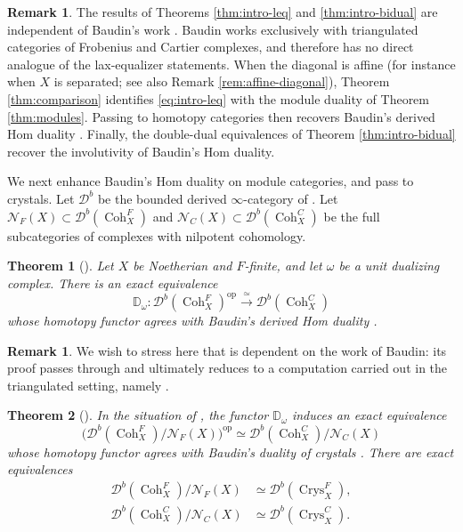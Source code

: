 \documentclass[11pt]{amsart}
\newcommand{\cN}{\mathcal{N}}
\newcommand{\op}{{\operatorname{op}}}
\newcommand{\Coh}{\operatorname{{Coh}}}
\newcommand{\Crys}{\operatorname{Crys}}
\newcommand{\Db}{\mathcal D^b}
\theoremstyle{plain}
\newtheorem{introthm}{Theorem}
\theoremstyle{definition}
\newtheorem{rmk}[rmk]{Remark}
\newtheorem{remark}[remark]{Remark}
\numberwithin{equation}{section}
\begin{document}
\begin{remark}\label{rem:intro-no-baudin}
The results of Theorems \ref{thm:intro-leq} and \ref{thm:intro-bidual} are independent of Baudin’s work \cite{Bau}. Baudin works exclusively with triangulated categories of Frobenius and Cartier complexes, and therefore has no direct analogue of the lax-equalizer statements. When the diagonal is affine (for instance when $X$ is separated; see also Remark \ref{rem:affine-diagonal}), Theorem \ref{thm:comparison} identifies \eqref{eq:intro-leq} with the module duality of Theorem \ref{thm:modules}. Passing to homotopy categories then recovers Baudin’s derived Hom duality \cite[Theorem 4.2.7]{Bau}. Finally, the double-dual equivalences of Theorem \ref{thm:intro-bidual} recover the involutivity of Baudin’s Hom duality.
\end{remark}

We next enhance Baudin's Hom duality on module categories, and pass to crystals.
Let $\Db$ be the bounded derived $\infty$-category of .
Let $\cN_F(X)\subset\Db(\Coh^F_X)$ and $\cN_C(X)\subset\Db(\Coh^C_X)$ be the full subcategories of complexes with nilpotent cohomology.

\begin{introthm}[{}]\label{thm:intro}
Let $X$ be Noetherian and $F$-finite, and let $\omega$ be a unit dualizing complex.
There is an exact equivalence
\[
 \mathbb D_\omega:\Db(\Coh^F_X)^{\op}\xrightarrow{\ \simeq\ }\Db(\Coh^C_X)
\]
whose homotopy functor agrees with Baudin's derived Hom duality \cite[Theorem 4.2.7]{Bau}.
\end{introthm}
\begin{rmk}
We wish to stress here that   is dependent on the work of Baudin: its proof passes through  and ultimately reduces to a computation carried out in the triangulated setting, namely \cite[Theorem 4.2.7]{Bau}.
\end{rmk}

\begin{introthm}[{}]\label{thm:intro-crystals}
In the situation of , the functor $\mathbb D_\omega$ induces an exact equivalence
\[
 \bigl(\Db(\Coh^F_X)/\cN_F(X)\bigr)^{\op}
       \simeq\Db(\Coh^C_X)/\cN_C(X)
\]
whose homotopy functor agrees with Baudin's duality of crystals \cite[Theorem 4.3.5]{Bau}.
There are exact equivalences
\begin{align*}
 \Db(\Coh^F_X)/\cN_F(X)
       &
       \simeq\Db(\Crys^F_X),\\
 \Db(\Coh^C_X)/\cN_C(X)
       &
       \simeq\Db(\Crys^C_X).
\end{align*}
\end{introthm}
\end{document}
